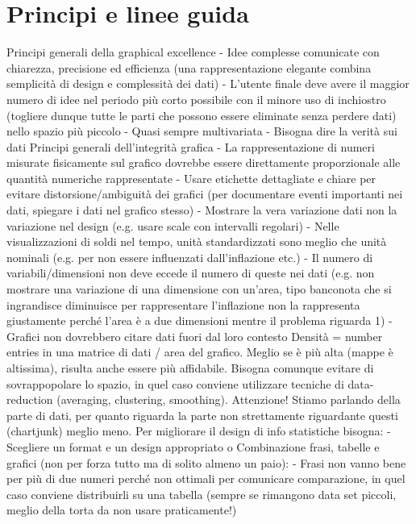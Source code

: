 \section{Principi e linee guida}
Principi generali della graphical excellence
-	Idee complesse comunicate con chiarezza, precisione ed efficienza (una rappresentazione elegante combina semplicità di design e complessità dei dati)
-	L'utente finale deve avere il maggior numero di idee nel periodo più corto possibile con il minore uso di inchiostro (togliere dunque tutte le parti che possono essere eliminate senza perdere dati) nello spazio più piccolo
-	Quasi sempre multivariata 
-	Bisogna dire la verità sui dati
Principi generali dell'integrità grafica
-	La rappresentazione di numeri misurate fisicamente sul grafico dovrebbe essere direttamente proporzionale alle quantità numeriche rappresentate
-	Usare etichette dettagliate e chiare per evitare distorsione/ambiguità dei grafici (per documentare eventi importanti nei dati, spiegare i dati nel grafico stesso)
-	Mostrare la vera variazione dati non la variazione nel design (e.g. usare scale con intervalli regolari)
-	Nelle visualizzazioni di soldi nel tempo, unità standardizzati sono meglio che unità nominali (e.g. per non essere influenzati dall'inflazione etc.)
-	Il numero di variabili/dimensioni non deve eccede il numero di queste nei dati (e.g. non mostrare una variazione di una dimensione con un'area, tipo banconota che si ingrandisce diminuisce per rappresentare l'inflazione non la rappresenta giustamente perché l'area è a due dimensioni mentre il problema riguarda 1)
-	Grafici non dovrebbero citare dati fuori dal loro contesto
Densità = number entries in una matrice di dati / area del grafico.
Meglio se è più alta (mappe è altissima), risulta anche essere più affidabile. Bisogna comunque evitare di sovrappopolare lo spazio, in quel caso conviene utilizzare tecniche di data-reduction (averaging, clustering, smoothing).
Attenzione! Stiamo parlando della parte di dati, per quanto riguarda la parte non strettamente riguardante questi (chartjunk) meglio meno.
Per migliorare il design di info statistiche bisogna:
-	Scegliere un format e un design appropriato
    o	Combinazione frasi, tabelle e grafici (non per forza tutto ma di solito almeno un paio):
        -	Frasi non vanno bene per più di due numeri perché non ottimali per comunicare comparazione, in quel caso conviene distribuirli su una tabella (sempre se rimangono data set piccoli, meglio della torta da non usare praticamente!)
